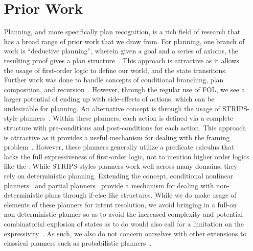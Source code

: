 \section{Prior Work}

Planning, and more specifically plan recognition, is a rich field of
research that has a broad range of prior work that we draw from. For planning,
one branch of work is ``deductive planning'', wherein given a goal and a series 
of axioms,
the resulting proof gives a plan structure~\cite{green_application_1969}. This
approach is attractive as it allows the usage of first-order logic to define
our world, and the state transitions. Further work was done to handle concepts
of conditional branching, plan composition, and 
recursion~\cite{metzing_plan_1989,biundo_deductive_1992,rosenschein_plan_1981}.
However, through the regular use of FOL, we see a larger potential of ending
up with side-effects of actions, which can be undesirable for planning. An
alternative concept is through the usage of STRIPS-style 
planners~\cite{fikes_strips_1971}. Within these planners, each action is
defined via a complete structure with pre-conditions and post-conditions for
each action. This approach is attractive as it provides a useful mechanism for
dealing with the framing problem~\cite{mccarthy_philosophical_1969}. However,
these planners generally utilize a predicate calculus that lacks the full
expressiveness of first-order logic, not to mention higher order logics like
the \CEC. While STRIPS-styles planners work well across many domains, they
rely on deterministic planning. Extending the concept, conditional nonlinear
planners~\cite{peot_conditional_1992} and partial 
planners~\cite{pryor_planning_1996}
provide a mechanism for dealing with non-deterministic plans through if-else
like structures. While we do make usage of elements of these planners for
intent resolution, we avoid bringing in a full-on non-deterministic planner
so as to avoid the increased complexity and potential combinatorial explosion
of states as to do would also call for a limitation on the
expressivity~\cite{rintanen_constructing_1999}. As such, we also do
not concern ourselves with other extensions to classical planners such as 
probabilistic 
planners~\cite{boutilier_decision-theoretic_1999,kaelbling_planning_1998}.

